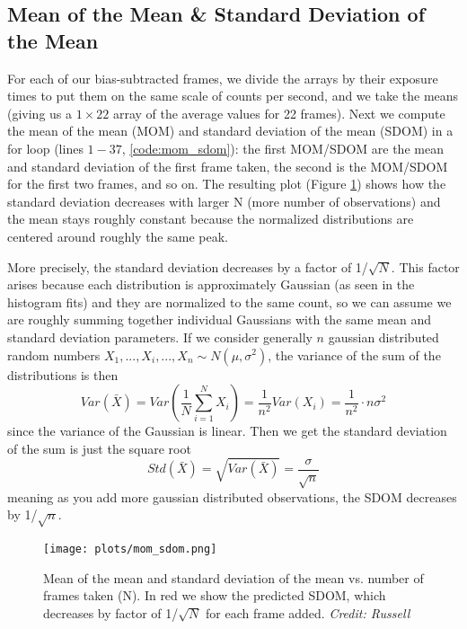 \documentclass[preprint]{aastex62}
\begin{document}
\subsection{Mean of the Mean \& Standard Deviation of the Mean}
For each of our bias-subtracted frames, we divide the arrays by their exposure times to put them on the same scale of counts per second, and we take the means (giving us a $1\times22$ array of the average values for 22 frames). Next we compute the mean of the mean (MOM) and standard deviation of the mean (SDOM) in a for loop (lines $1-37$, \ref{code:mom_sdom}): the first MOM/SDOM are the mean and standard deviation of the first frame taken, the second is the MOM/SDOM for the first two frames, and so on. The resulting plot (Figure \ref{fig:mom_sdom}) shows how the standard deviation decreases with larger N (more number of observations) and the mean stays roughly constant because the normalized distributions are centered around roughly the same peak.

More precisely, the standard deviation decreases by a factor of 1/$\sqrt{N}$. This factor arises because each distribution is approximately Gaussian (as seen in the histogram fits) and they are normalized to the same count, so we can assume we are roughly summing together individual Gaussians with the same mean and standard deviation parameters. If we consider generally $n$ gaussian distributed random numbers $X_1,...,X_i,...,X_n \sim N(\mu,\sigma^2)$, the variance of the sum of the distributions is then
\[Var(\bar{X}) = Var(\frac{1}{N}\sum_{i=1}^N X_i) = \frac{1}{n^2} Var(X_i) = \frac{1}{n^2} \cdot n\sigma^2 \]
since the variance of the Gaussian is linear. Then we get the standard deviation of the sum is just the square root
\[Std(\bar{X}) = \sqrt{Var(\bar{X})} = \frac{\sigma}{\sqrt{n}} \]
meaning as you add more gaussian distributed observations, the SDOM decreases by 1/$\sqrt{n}$.

\begin{figure}[H]
\begin{center}
\texttt{[image: plots/mom\_sdom.png]}
\caption{Mean of the mean and standard deviation of the mean vs. number of frames taken (N). In red we show the predicted SDOM, which decreases by factor of 1/$\sqrt{N}$ for each frame added. \textit{Credit: Russell}} \label{fig:mom_sdom}
\end{center}
\end{figure}
\end{document}
